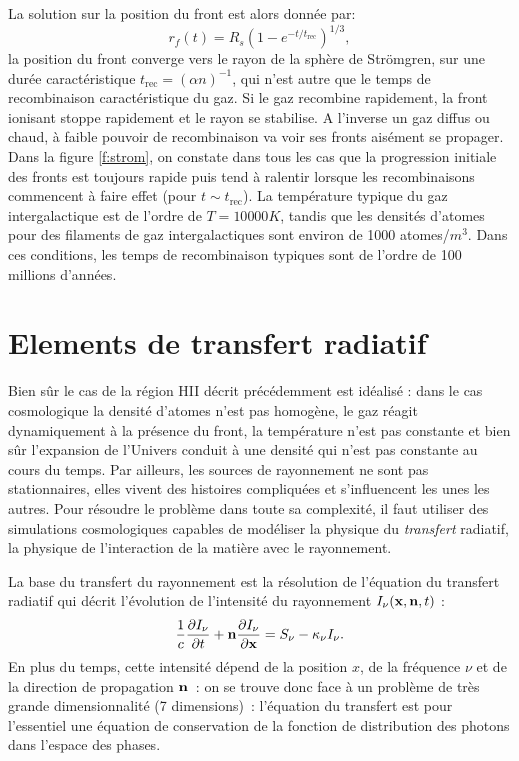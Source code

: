 La solution sur la position du front  est alors donnée par:
\begin{equation}
r_f(t)=R_s(1-e^{-t/t_\mathrm{rec}})^{1/3},
\end{equation}
la position du front converge vers le rayon de la sphère de Strömgren, sur une durée caractéristique $t_\mathrm{rec}=(\alpha n)^{-1}$, qui n'est autre que le temps de recombinaison caractéristique du gaz. Si le gaz recombine rapidement, la front ionisant stoppe rapidement et le rayon se stabilise. A l'inverse un gaz diffus ou chaud, à faible pouvoir de recombinaison va voir ses fronts aisément se propager. Dans la figure \ref{f:strom}, on constate dans tous les cas que la progression initiale des fronts est toujours rapide puis tend à ralentir lorsque les recombinaisons commencent à faire effet (pour $t\sim t_\mathrm{rec}$). La température typique du gaz intergalactique est de l'ordre de $T=10 000 K$, tandis que les densités d'atomes pour des filaments de gaz intergalactiques sont environ de 1000 atomes/$m^3$. Dans ces conditions, les temps de recombinaison typiques sont de l'ordre de 100 millions d'années.

\section{Elements de transfert radiatif}

Bien sûr le cas de la région HII décrit précédemment est idéalisé : dans le cas cosmologique la densité d'atomes n'est pas homogène, le gaz réagit dynamiquement à la présence du front, la température n'est pas constante et bien sûr l'expansion de l'Univers conduit à une densité qui n'est pas constante au cours du temps. Par ailleurs, les sources de rayonnement ne sont pas stationnaires, elles vivent des histoires compliquées et s'influencent les unes les autres. Pour résoudre le problème dans toute sa complexité, il faut utiliser des simulations cosmologiques capables de modéliser la physique du \textit{transfert} radiatif, la physique de l'interaction de la matière avec le rayonnement. 

La base du transfert du rayonnement est la résolution de l'équation du transfert radiatif qui décrit l'évolution de l'intensité du rayonnement $I_\nu({\bf x},{\bf n} ,t)$ :
\begin{equation}
\frac{1}{c}\frac{\partial I_\nu}{\partial t}+{\bf n} \frac{\partial I_\nu}{\partial {\bf x}}=S_\nu - \kappa_\nu I_\nu.
\end{equation}
En plus du temps, cette intensité dépend de la position $x$, de la fréquence $\nu$ et de la direction de propagation $\bf n$~: on se trouve donc face à un problème de très grande dimensionnalité (7 dimensions)~: l'équation du transfert est pour l'essentiel une équation de conservation de la fonction de distribution des photons dans l'espace des phases.

